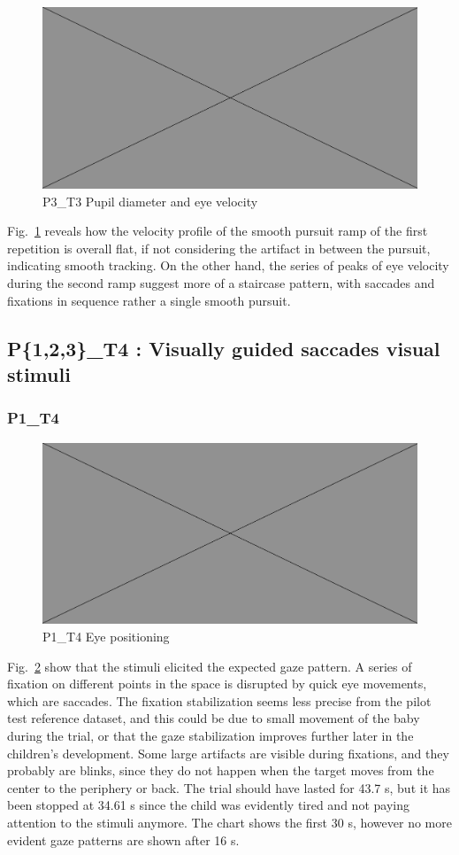 \begin{figure}[h]
  \centering
  \includegraphics[width=.5\textwidth]{figures/placeholderImg.jpg}
  \caption[P3\_T3 pupil velocity]{P3\_T3 Pupil diameter and eye velocity}
  \label{fig:P3_T3_vel}
\end{figure}

Fig.~\ref{fig:P3_T3_vel} reveals how the velocity profile of the smooth pursuit ramp of the first repetition is overall flat, if not considering the artifact in between the pursuit, indicating smooth tracking. On the other hand, the series of peaks of eye velocity during the second ramp suggest more of a staircase pattern, with saccades and fixations in sequence rather a single smooth pursuit.

\subsection{P\{1,2,3\}\_T4 : Visually guided saccades visual stimuli}
\label{sec:P123_T4}


\subsubsection{P1\_T4}
\label{sec:P1_T1}

\begin{figure}[h]
  \centering
  \includegraphics[width=.5\textwidth]{figures/placeholderImg.jpg}
  \caption[P1\_T4 Eye positioning]{P1\_T4 Eye positioning}
  \label{fig:P1_T4_pos}
\end{figure}

Fig.~\ref{fig:P1_T4_pos} show that the stimuli elicited the expected gaze pattern. A series of fixation on different points in the space is disrupted by quick eye movements, which are saccades. The fixation stabilization seems less precise from the pilot test reference dataset, and this could be due to small movement of the baby during the trial, or that the gaze stabilization improves further later in the children’s development. Some large artifacts are visible during fixations, and they probably are blinks, since they do not happen when the target moves from the center to the periphery or back.
The trial should have lasted for 43.7 s, but it has been stopped at 34.61 s since the child was evidently tired and not paying attention to the stimuli anymore. The chart shows the first 30 s, however no more evident gaze patterns are shown after 16 s.

